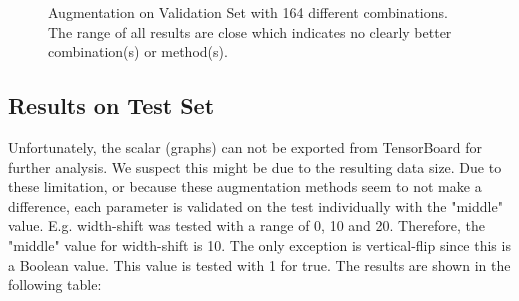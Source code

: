 \begin{figure}[!ht]
    \centering
    \par\medskip
    \centering
    \par\medskip
  \caption{Augmentation on Validation Set with 164 different combinations. The range of all results are close which indicates no clearly better combination(s) or method(s).}
  \label{fig:augm_val}
\end{figure}

\subsection{Results on Test Set}
Unfortunately, the scalar (graphs) can not be exported from TensorBoard for further analysis. We suspect this might be due to the resulting data size. Due to these limitation, or because these augmentation methods seem to not make a difference, each parameter is validated on the test individually with the "middle" value. E.g. width-shift was tested with a range of 0, 10 and 20. Therefore, the "middle" value for width-shift is 10. The only exception is vertical-flip since this is a Boolean value. This value is tested with 1 for true. The results are shown in the following table:

